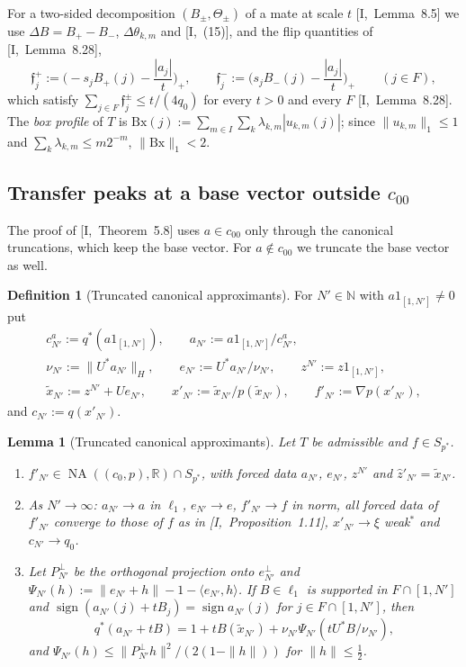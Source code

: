 \documentclass[10pt]{amsart}
\newtheorem{lemma}[theorem]{Lemma}
\theoremstyle{definition}
\newtheorem{definition}[theorem]{Definition}
\theoremstyle{remark}
\newcommand{\NA}{\operatorname{NA}}
\newcommand{\sgn}{\operatorname{sign}}
\newcommand{\R}{\mathbb R}
\newcommand{\N}{\mathbb N}
\newcommand{\zh}{\hat z}
\newcommand{\ip}[2]{\langle #1,#2\rangle}
\begin{document}
For a two-sided decomposition $(B_\pm,\Theta_\pm)$ of a mate at scale $t$
[I,~Lemma~8.5] we use $\Delta B=B_+-B_-$, $\Delta\theta_{k,m}$ and
[I,~(15)], and the flip quantities of [I,~Lemma~8.28],
\[
 \mathfrak f^+_j:=\Big(-s_jB_+(j)-\frac{|a_j|}t\Big)_+,\qquad
 \mathfrak f^-_j:=\Big(s_jB_-(j)-\frac{|a_j|}t\Big)_+\qquad(j\in F),
\]
which satisfy $\sum_{j\in F}\mathfrak f^\pm_j\le t/(4q_0)$ for every $t>0$
and every $F$ [I,~Lemma~8.28].  The \emph{box profile} of $T$ is
$\mathrm{Bx}(j):=\sum_{m\in I}\sum_k\lambda_{k,m}|u_{k,m}(j)|$; since
$\|u_{k,m}\|_1\le1$ and $\sum_k\lambda_{k,m}\le m2^{-m}$, $\|\mathrm{Bx}\|_1
<2$.

\subsection{Transfer peaks at a base vector outside $c_{00}$}
\label{subsec:II-transferinf}

The proof of [I,~Theorem~5.8] uses $a\in c_{00}$ only through the canonical
truncations, which keep the base vector.  For $a\notin c_{00}$ we truncate
the base vector as well.

\begin{definition}[Truncated canonical approximants]\label{def:II-trunc}
For $N'\in\N$ with $a1_{[1,N']}\ne0$ put
\begin{gather*}
 c^a_{N'}:=q^*(a1_{[1,N']}),\qquad a_{N'}:=a1_{[1,N']}/c^a_{N'},\\
 \nu_{N'}:=\|U^*a_{N'}\|_H,\qquad e_{N'}:=U^*a_{N'}/\nu_{N'},\qquad
 z^{N'}:=z1_{[1,N']},\\ \tilde x_{N'}:=z^{N'}+Ue_{N'},\qquad
 x'_{N'}:=\tilde x_{N'}/p(\tilde x_{N'}),\qquad f'_{N'}:=\nabla p(x'_{N'}),
\end{gather*}
and $c_{N'}:=q(x'_{N'})$.
\end{definition}

\begin{lemma}[Truncated canonical approximants]\label{lem:II-trunc}
Let $T$ be admissible and $f\in S_{p^*}$.
\begin{enumerate}
\item[(a)] $f'_{N'}\in\NA((c_0,p),\R)\cap S_{p^*}$, with forced data
$a_{N'}$, $e_{N'}$, $z^{N'}$ and $\zh'_{N'}=\tilde x_{N'}$.
\item[(b)] As $N'\to\infty$: $a_{N'}\to a$ in $\ell_1$, $e_{N'}\to e$,
$f'_{N'}\to f$ in norm, all forced data of $f'_{N'}$ converge to those of
$f$ as in [I,~Proposition~1.11], $x'_{N'}\to\xi$ weak$^*$ and
$c_{N'}\to q_0$.
\item[(c)] Let $P_{N'}^\perp$ be the orthogonal projection onto
$e_{N'}^\perp$ and $\Psi_{N'}(h):=\|e_{N'}+h\|-1-\ip{e_{N'}}h$.  If
$B\in\ell_1$ is supported in $F\cap[1,N']$ and $\sgn(a_{N'}(j)+tB_j)=
\sgn a_{N'}(j)$ for $j\in F\cap[1,N']$, then
\[
 q^*(a_{N'}+tB)=1+tB(\tilde x_{N'})+\nu_{N'}\Psi_{N'}(tU^*B/\nu_{N'}),
\]
and $\Psi_{N'}(h)\le\|P^\perp_{N'}h\|^2/(2(1-\|h\|))$ for $\|h\|\le\frac12$.
\end{enumerate}
\end{lemma}
\end{document}
